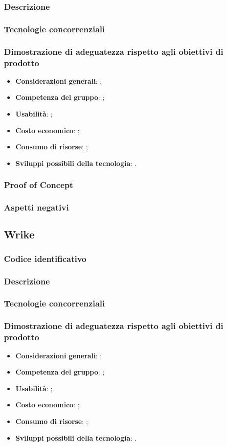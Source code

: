 \documentclass[./../Technology Baseline.tex]{subfiles}
\begin{document}
\subsubsection{Descrizione}
\subsubsection{Tecnologie concorrenziali}
\subsubsection{Dimostrazione di adeguatezza rispetto agli obiettivi di prodotto}
\begin{itemize}
	\item \textbf{Considerazioni generali}: ;
	\item \textbf{Competenza del gruppo}: ;
	\item \textbf{Usabilità}: ;
	\item \textbf{Costo economico}: ;
	\item \textbf{Consumo di risorse}: ;
	\item \textbf{Sviluppi possibili della tecnologia}: .
\end{itemize}
\subsubsection{Proof of Concept}
\subsubsection{Aspetti negativi}

\subsection{Wrike}

\subsubsection{Codice identificativo}
\subsubsection{Descrizione}
\subsubsection{Tecnologie concorrenziali}
\subsubsection{Dimostrazione di adeguatezza rispetto agli obiettivi di prodotto}
\begin{itemize}
	\item \textbf{Considerazioni generali}: ;
	\item \textbf{Competenza del gruppo}: ;
	\item \textbf{Usabilità}: ;
	\item \textbf{Costo economico}: ;
	\item \textbf{Consumo di risorse}: ;
	\item \textbf{Sviluppi possibili della tecnologia}: .
\end{itemize}
\end{document}
